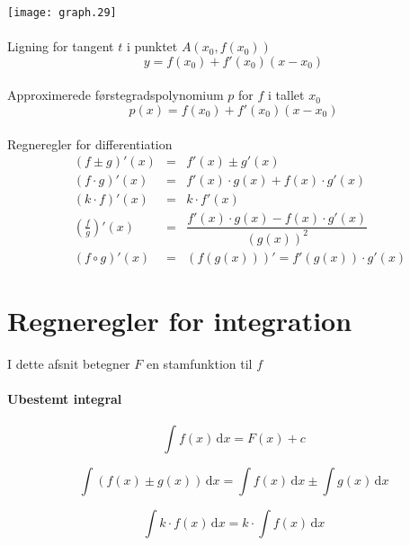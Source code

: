 \documentclass[11pt,a5paper,fleqn,leqno]{book}
\begin{document}
\texttt{[image: graph.29]}
\\
\\
Ligning for tangent $t$ i punktet $A(x_0,f(x_0))$
\begin{equation} \label{eq:diff_tangent_t}
y = f(x_0) + f'(x_0)(x-x_0)
\end{equation}
\\
Approximerede førstegradspolynomium $p$ for $f$ i tallet $x_0$
\begin{equation} \label{eq:diff_tangent_p}
p(x) = f(x_0) + f'(x_0)(x-x_0)
\end{equation}
\\
Regneregler for differentiation
\begin{eqnarray}
\quad \left(f \pm g\right)'(x)     & = & f'(x) \pm g'(x) \\
\quad \left(f \cdot g\right)'(x)   & = & f'(x) \cdot g(x) + f(x) \cdot g'(x) \\
\quad \left(k \cdot f\right)'(x)   & = & k \cdot f'(x) \\
\quad \left(\frac{f}{g}\right)'(x) & = & \dfrac{f'(x) \cdot g(x) - f(x) \cdot g'(x)}{\left(g(x)\right)^2} \\
\quad \left(f \circ g\right)'(x)   & = & \left(f\left(g(x)\right)\right)' = f'\left(g(x)\right) \cdot g'(x)
\end{eqnarray}

\vfill

\section{Regneregler for integration}

I dette afsnit betegner $F$ en stamfunktion til $f$

\paragraph{Ubestemt integral}

\begin{equation}
\int f(x)\, \mathrm{d}x = F(x) + c
\end{equation}

\begin{equation}
\int \left(f(x) \pm g(x)\right)\, \mathrm{d}x = \int f(x)\, \mathrm{d}x \pm \int g(x)\, \mathrm{d}x
\end{equation}

\begin{equation}
\int k \cdot f(x)\, \mathrm{d}x = k \cdot \int f(x)\, \mathrm{d}x
\end{equation}
\end{document}
